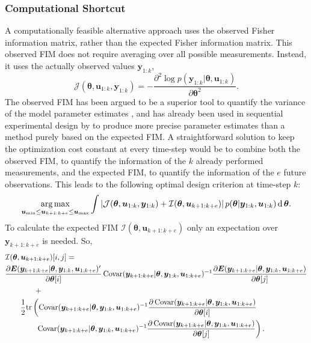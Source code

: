 \subsubsection{Computational Shortcut}
A computationally feasible alternative approach uses the observed Fisher information matrix, rather than the expected Fisher information matrix. This observed FIM does not require averaging over all possible measurements. Instead, it uses the actually observed values $\bm y_{1:k}$,
\begin{equation}
\mathcal{J}(\bm \theta,\bm u_{1:k}, \bm y_{1:k}) = 
-\frac{\partial^2 \log p(\bm y_{1:k}|\bm \theta, \bm u_{1:k})}{\partial \bm \theta^2}.
\label{observedFIM}
\end{equation}
The observed FIM has been argued to be a superior tool to quantify the variance of the model parameter estimates \parencite{efron}, and has already been used in sequential experimental design by \textcite{lane} to produce more precise parameter estimates than a method purely based on the expected FIM. A straightforward solution to keep the optimization cost constant at every time-step would be to combine both the observed FIM, to quantify the information of the $k$ already performed measurements, and the expected FIM, to quantify the information of the $e$ future observations. This leads to the following optimal design criterion at time-step $k$:
\begin{equation}
\operatorname*{arg\,max}_{\bm u_\text{min} \leq \bm u_{k+1:k+e} \leq \bm u_\text{max}} \int \left |\mathcal{J}(\bm \theta,\bm u_{1:k}, \bm y_{1:k}) + \mathcal{I}(\bm \theta,\bm u_{k+1:k+e}) \right | p(\bm \theta | \bm y_{1:k}, \bm u_{1:k}) \operatorname{\mathrm{d}} \bm \theta.
\label{adaptive bayesian optimality}
\end{equation}
To calculate the expected FIM $\mathcal{I}(\bm \theta,\bm u_{k+1:k+e})$ only an expectation over $\bm y_{k+1:k+e}$ is needed. So,
\begin{equation}
\label{expectedFIMk}
\begin{aligned}
&\mathcal{I}(\bm \theta,\bm u_{k+1:k+e})[i,j]= \\
&\frac{\partial \bm E (\bm y_{k+1:k+e}| \bm \theta, \bm y_{1:k}, \bm u_{1:k+e})'}{\partial \bm \theta[i]}
\operatorname{\mathrm{Covar}}(\bm y_{k+1:k+e}| \bm \theta, \bm y_{1:k},\bm u_{1:k+e})^{-1}\frac{\partial \bm E (\bm y_{k+1:k+e}| \bm \theta, \bm y_{1:k},\bm u_{1:k+e})}{\partial \bm \theta[j]} \\ & \qquad \qquad + \\
&\qquad\frac{1}{2}
\text{tr} \left (
\operatorname{\mathrm{Covar}}(\bm y_{k+1:k+e}| \bm \theta, \bm y_{1:k},\bm u_{1:k+e})^{-1}
\frac{\partial \operatorname{\mathrm{Covar}}(\bm y_{k+1:k+e}| \bm \theta, \bm y_{1:k},\bm u_{1:k+e})}{\partial \bm \theta[i]} \right.\\
&\qquad \left. \qquad\operatorname{\mathrm{Covar}}(\bm y_{k+1:k+e}| \bm \theta, \bm y_{1:k},\bm u_{1:k+e})^{-1} 
\frac{\partial \operatorname{\mathrm{Covar}}(\bm y_{k+1:k+e}| \bm \theta, \bm y_{1:k},\bm u_{1:k+e})}{\partial \bm \theta[j]}
\right ).
\end{aligned}
\end{equation}
